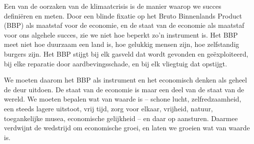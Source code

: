 
Een van de oorzaken van de klimaatcrisis is de manier waarop we succes definiëren en meten. Door een blinde fixatie op het Bruto Binnenlands Product (BBP) als maatstaf voor de economie, en de staat van de economie als maatstaf voor ons algehele succes, zie we niet hoe beperkt zo’n instrument is. Het BBP meet niet hoe duurzaam een land is, hoe gelukkig mensen zijn, hoe zelfstandig burgers zijn. Het BBP stijgt bij elk gasveld dat wordt gevonden en geëxploiteerd, bij elke reparatie door aardbevingsschade, en bij elk vliegtuig dat opstijgt.

We moeten daarom het BBP als instrument en het economisch denken als geheel de deur uitdoen. De staat van de economie is maar een deel van de staat van de wereld. We moeten bepalen wat van waarde is – schone lucht, zelfredzaamheid, een steeds lagere uitstoot, vrij tijd, zorg voor elkaar, vrijheid, natuur, toegankelijke musea, economische gelijkheid – en daar op aansturen. Daarmee verdwijnt de wedstrijd om economische groei, en laten we groeien wat van waarde is.
